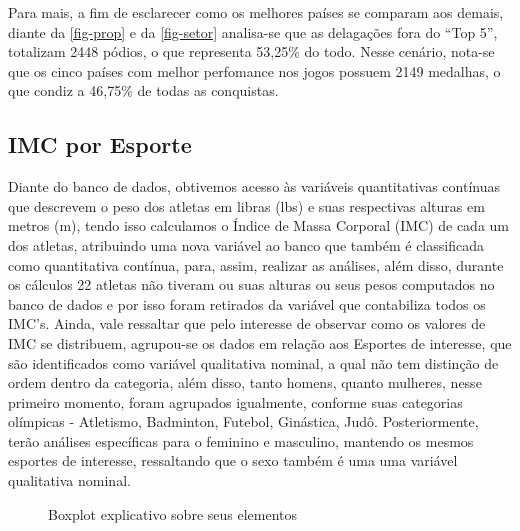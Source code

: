 \documentclass[
]{estat/estat}
\begin{document}
Para mais, a fim de esclarecer como os melhores países se comparam aos
demais, diante da \ref{fig-prop} e da \ref{fig-setor} analisa-se que as
delagações fora do ``Top 5'', totalizam 2448 pódios, o que representa
53,25\% do todo. Nesse cenário, nota-se que os cinco países com melhor
perfomance nos jogos possuem 2149 medalhas, o que condiz a 46,75\% de
todas as conquistas.

\subsection{IMC por Esporte}\label{imc-por-esporte}

Diante do banco de dados, obtivemos acesso às variáveis quantitativas
contínuas que descrevem o peso dos atletas em libras (lbs) e suas
respectivas alturas em metros (m), tendo isso calculamos o Índice de
Massa Corporal (IMC) de cada um dos atletas, atribuindo uma nova
variável ao banco que também é classificada como quantitativa contínua,
para, assim, realizar as análises, além disso, durante os cálculos 22
atletas não tiveram ou suas alturas ou seus pesos computados no banco de
dados e por isso foram retirados da variável que contabiliza todos os
IMC's. Ainda, vale ressaltar que pelo interesse de observar como os
valores de IMC se distribuem, agrupou-se os dados em relação aos
Esportes de interesse, que são identificados como variável qualitativa
nominal, a qual não tem distinção de ordem dentro da categoria, além
disso, tanto homens, quanto mulheres, nesse primeiro momento, foram
agrupados igualmente, conforme suas categorias olímpicas - Atletismo,
Badminton, Futebol, Ginástica, Judô. Posteriormente, terão análises
específicas para o feminino e masculino, mantendo os mesmos esportes de
interesse, ressaltando que o sexo também é uma uma variável qualitativa
nominal.

\begin{figure}

\caption{\label{fig-e-box-expli}Boxplot explicativo sobre seus
elementos}


\end{figure}%
\end{document}
